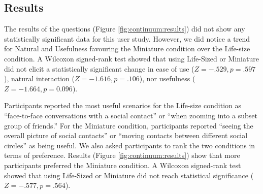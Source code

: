 \subsection{Results}

The results of the questions (Figure \ref{fig:continuum:results}) did not show any statistically significant data for this user study. However, we did notice a trend for Natural and Usefulness favouring the Miniature condition over the Life-size condition. A Wilcoxon signed-rank test showed that using Life-Sized or Miniature did not elicit a statistically significant change in ease of use ($Z=-.529, p=.597$), natural interaction ($Z=-1.616, p=.106$), nor usefulness ($Z=-1.664, p=0.096$). 

Participants reported the most useful scenarios for the Life-size condition as \enquote{face-to-face conversations with a social contact} or \enquote{when zooming into a subset group of friends.} For the Miniature condition, participants reported \enquote{seeing the overall picture of social contacts} or \enquote{moving contacts between different social circles} as being useful. We also asked participants to rank the two conditions in terms of preference. Results (Figure \ref{fig:continuum:results}) show that more participants preferred the Miniature condition. A Wilcoxon signed-rank test showed that using Life-Sized or Miniature did not reach statistical significance ($Z=-.577, p=.564$).

